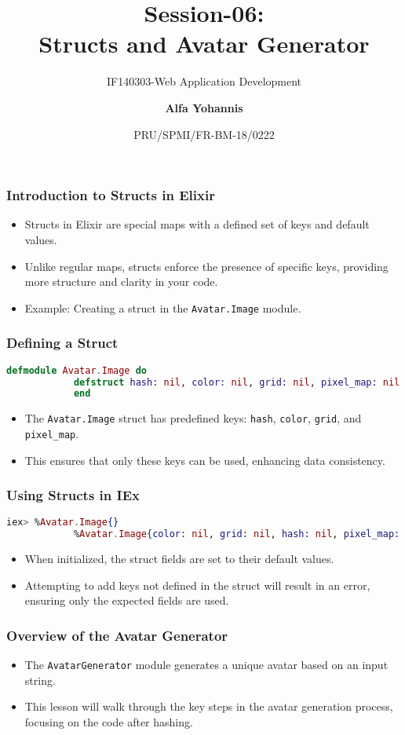 \documentclass[aspectratio=169, table]{beamer}
\subtitle{IF140303-Web Application Development}
\title{\LARGE{Session-06:\\ Structs and Avatar Generator}}
\date[Serial]{\scriptsize {PRU/SPMI/FR-BM-18/0222}}
\author[Pradita]{\small{\textbf{Alfa Yohannis}}}
\begin{document}
	
	\frame{\titlepage}
	
	\begin{frame}
		\frametitle{Introduction to Structs in Elixir}
		\begin{itemize}
			\item Structs in Elixir are special maps with a defined set of keys and default values.
			\item Unlike regular maps, structs enforce the presence of specific keys, providing more structure and clarity in your code.
			\item Example: Creating a struct in the \texttt{Avatar.Image} module.
		\end{itemize}
	\end{frame}
	
	\begin{frame}[fragile]
		\frametitle{Defining a Struct}
		\begin{lstlisting}[language=Elixir]
			defmodule Avatar.Image do
			defstruct hash: nil, color: nil, grid: nil, pixel_map: nil
			end
		\end{lstlisting}
		\begin{itemize}
			\item The \texttt{Avatar.Image} struct has predefined keys: \texttt{hash}, \texttt{color}, \texttt{grid}, and \texttt{pixel\_map}.
			\item This ensures that only these keys can be used, enhancing data consistency.
		\end{itemize}
	\end{frame}
	
	\begin{frame}[fragile]
		\frametitle{Using Structs in IEx}
		\begin{lstlisting}[language=Elixir]
			iex> %Avatar.Image{}
			%Avatar.Image{color: nil, grid: nil, hash: nil, pixel_map: nil}
		\end{lstlisting}
		\begin{itemize}
			\item When initialized, the struct fields are set to their default values.
			\item Attempting to add keys not defined in the struct will result in an error, ensuring only the expected fields are used.
		\end{itemize}
	\end{frame}
	
	\begin{frame}
		\frametitle{Overview of the Avatar Generator}
		\begin{itemize}
			\item The \texttt{AvatarGenerator} module generates a unique avatar based on an input string.
			\item This lesson will walk through the key steps in the avatar generation process, focusing on the code after hashing.
		\end{itemize}
	\end{frame}
	
\end{document}
